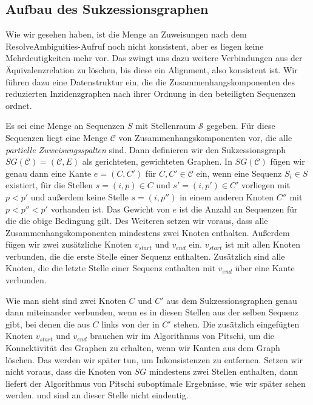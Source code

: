 \subsection{Aufbau des Sukzessionsgraphen}

Wie wir gesehen haben, ist die Menge an Zuweisungen nach dem \textrm{ResolveAmbiguities}-Aufruf noch nicht konsistent, aber es liegen keine Mehrdeutigkeiten mehr vor. Das zwingt uns dazu weitere Verbindungen aus der Äquivalenzrelation zu löschen, bis diese ein Alignment, also konsistent ist. Wir führen dazu eine Datenstruktur ein, die die Zusammenhangskomponenten des reduzierten Inzidenzgraphen nach ihrer Ordnung in den beteiligten Sequenzen ordnet.

\begin{definition}[Sukzessionsgraph]
	Es sei eine Menge an Sequenzen $S$ mit Stellenraum $\mathcal{S}$ gegeben. Für diese Sequenzen liegt eine Menge $\mathcal{C}$ von Zusammenhangskomponenten vor, die alle \emph{partielle Zuweisungsspalten} sind. Dann definieren wir den Sukzessionsgraph $SG(\mathcal{C}) = (\mathcal{C},E)$ als gerichteten, gewichteten Graphen. In $SG(\mathcal{C})$ fügen wir genau dann eine Kante $e = (C,C')$ für $C,C' \in \mathcal{C}$ ein, wenn eine Sequenz $S_i \in S$ existiert, für die Stellen $s = (i,p) \in C$ und $s' = (i,p') \in C'$ vorliegen mit $p < p'$ und außerdem keine Stelle $s = (i,p'')$ in einem anderen Knoten $C''$ mit $p < p'' < p'$ vorhanden ist. Das Gewicht von $e$ ist die Anzahl an Sequenzen für die die obige Bedingung gilt. Des Weiteren setzen wir voraus, dass alle Zusammenhangskomponenten mindestens zwei Knoten enthalten.
	Außerdem fügen wir zwei zusätzliche Knoten $v_{start}$ und $v_{end}$ ein. $v_{start}$ ist mit allen Knoten verbunden, die die erste Stelle einer Sequenz enthalten. Zusätzlich sind alle Knoten, die die letzte Stelle einer Sequenz enthalten mit $v_{end}$ über eine Kante verbunden.
\end{definition}


Wie man sieht sind zwei Knoten $C$ und $C'$ aus dem Sukzessionsgraphen genau dann miteinander verbunden, wenn es in diesen Stellen aus der selben Sequenz gibt, bei denen die aus $C$ links von der in $C'$ stehen. Die zusätzlich eingefügten Knoten $v_{start}$ und $v_{end}$ brauchen wir im Algorithmus von Pitschi, um die Konnektivität des Graphen zu erhalten, wenn wir Kanten aus dem Graph löschen. Das werden wir später tun, um Inkonsistenzen zu entfernen. Setzen wir nicht voraus, dass die Knoten von $SG$ mindestens zwei Stellen enthalten, dann liefert der Algorithmus von Pitschi suboptimale Ergebnisse, wie wir später sehen werden. \cite{cpm10} und \cite{pdc10} sind an dieser Stelle nicht eindeutig. 

